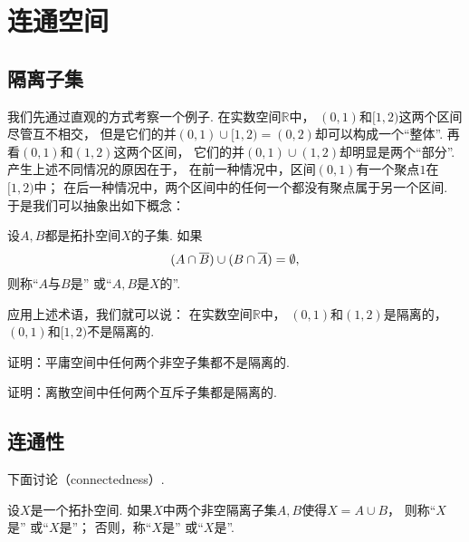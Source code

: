 \section{连通空间}
\subsection{隔离子集}
我们先通过直观的方式考察一个例子.
在实数空间\(\mathbb{R}\)中，
\((0,1)\)和\([1,2)\)这两个区间尽管互不相交，
但是它们的并\((0,1)\cup[1,2)=(0,2)\)却可以构成一个“整体”.
再看\((0,1)\)和\((1,2)\)这两个区间，
它们的并\((0,1)\cup(1,2)\)却明显是两个“部分”.
产生上述不同情况的原因在于，
在前一种情况中，区间\((0,1)\)有一个聚点\(1\)在\([1,2)\)中；
在后一种情况中，两个区间中的任何一个都没有聚点属于另一个区间.
于是我们可以抽象出如下概念：
\begin{definition}
设\(A,B\)都是拓扑空间\(X\)的子集.
如果\begin{equation*}
	(A \cap \overline{B}) \cup (B \cap \overline{A}) = \emptyset,
\end{equation*}
则称“\(A\)与\(B\)是”
或“\(A,B\)是\(X\)的”.
\end{definition}

应用上述术语，我们就可以说：
在实数空间\(\mathbb{R}\)中，
\((0,1)\)和\((1,2)\)是隔离的，
\((0,1)\)和\([1,2)\)不是隔离的.

\begin{example}
证明：平庸空间中任何两个非空子集都不是隔离的.
\end{example}

\begin{example}
证明：离散空间中任何两个互斥子集都是隔离的.
\end{example}

\subsection{连通性}
下面讨论（connectedness）.

\begin{definition}
设\(X\)是一个拓扑空间.
如果\(X\)中两个非空隔离子集\(A,B\)使得\(X = A \cup B\)，
则称“\(X\)是”
或“\(X\)是”；
否则，称“\(X\)是”
或“\(X\)是”.
\end{definition}

